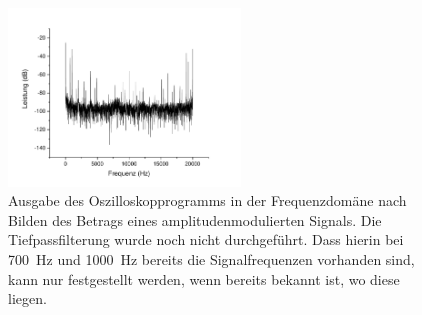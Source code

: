 \documentclass[
a4paper,
12pt,
pagesize,
ngerman
]{scrartcl}
\begin{document}
	\begin{figure}[H]  
		\includegraphics[width=0.55\textwidth]{Origin-Files/AM-Demod-Betrag-preTP}
		\centering
		\caption{Ausgabe des Oszilloskopprogramms in der Frequenzdomäne nach Bilden des Betrags eines amplitudenmodulierten Signals. Die Tiefpassfilterung wurde noch nicht durchgeführt.
		Dass hierin bei \SI{700}{\hertz} und \SI{1000}{\hertz} bereits die Signalfrequenzen vorhanden sind, kann nur festgestellt werden, wenn bereits bekannt ist, wo diese liegen.
		}
		\label{fig_tag3_am_demod_betrag_preTP}
		\centering
	\end{figure}
\end{document}
